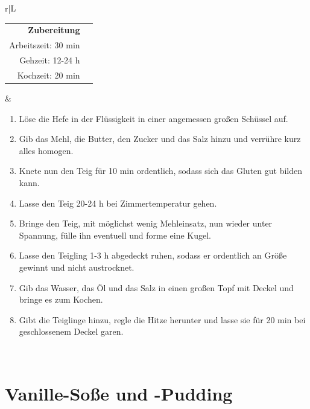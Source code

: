 \documentclass[a4paper, 12pt]{scrbook} 								%
\numberwithin{equation}{section} 									%
\begin{document}
		\begin{tabularx}{\textwidth}{r|L}
			\begin{tabular}[t]{rr}
				\textbf{Zubereitung}	\\
				Arbeitszeit: 30 min	\\
				Gehzeit: 12-24 h \\
				Kochzeit: 20 min \\
			\end{tabular}			&	\begin{enumerate}[nosep]
											\item Löse die Hefe in der Flüssigkeit in einer angemessen großen Schüssel auf.
											\item Gib das Mehl, die Butter, den Zucker und das Salz hinzu und verrühre kurz alles homogen.
											\item Knete nun den Teig für 10 min ordentlich, sodass sich das Gluten gut bilden kann.
											\item Lasse den Teig 20-24 h bei Zimmertemperatur gehen.
											\item Bringe den Teig, mit möglichst wenig Mehleinsatz, nun wieder unter Spannung, fülle ihn eventuell und forme eine Kugel.
											\item Lasse den Teigling 1-3 h abgedeckt ruhen, sodass er ordentlich an Größe gewinnt und nicht austrocknet.
											\item Gib das Wasser, das Öl und das Salz in einen großen Topf mit Deckel und bringe es zum Kochen.
											\item Gibt die Teiglinge hinzu, regle die Hitze herunter und lasse sie für 20 min bei geschlossenem Deckel garen.
										\end{enumerate}	\\
		\end{tabularx}
		\newpage


		\section{Vanille-Soße und -Pudding}	\label{vanillesosse}
\end{document}
